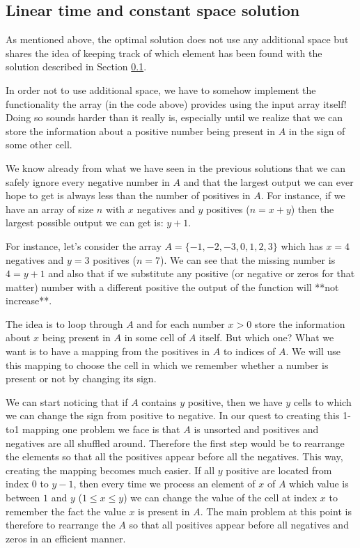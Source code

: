 \subsection{Linear time and constant space solution}
\label{first_positive_missing:sec:linear_space}
As mentioned above, the optimal solution does not use any additional space but shares the idea of keeping track of which element has been found with the solution described in Section \ref{first_positive_missing:sec:linear_space}. 

In order not to use additional space, we have to somehow implement the functionality the array  (in the code above) provides using the input array itself! Doing so sounds harder than it really is, especially until we realize that we can store the information about a positive number being present in $A$ in the sign of some other cell.

We know already from what we have seen in the previous solutions that we can safely ignore every negative number in $A$ and that the largest output we can ever hope to get is always less than the number of positives in $A$. For instance, if we have an array of size $n$ with $x$ negatives and $y$ positives ($n=x+y$) then the largest possible output we can get is: $y+1$. 

For instance, let's consider the array $A=\{-1, -2, -3, 0, 1, 2, 3\}$ which has $x=4$ negatives and $y=3$ positives ($n=7$). We can see that the missing number is $4=y+1$ and also that if we substitute any positive (or negative or zeros for that matter) number with a different positive the output of the function will **not increase**. 

The idea is to loop through $A$ and for each number $x>0$ store the information about $x$ being present in $A$ in some cell of $A$ itself. But which one? What we want is to have a mapping from the positives in $A$ to indices of $A$. We will use this mapping to choose the cell in which we remember whether a number is present or not by changing its sign.

We can start noticing that if $A$ contains $y$ positive, then we have $y$ cells to which we can change the sign from positive to negative. In our quest to creating this 1-to1 mapping one problem we face is that $A$ is unsorted and positives and negatives are all shuffled around. Therefore the first step would be to rearrange the elements so that all the positives appear before all the negatives. This way, creating the mapping becomes much easier. If all $y$ positive are located from index $0$ to $y-1$, then every time we process an element of $x$ of $A$ which value is between $1$ and $y$ ($1 \leq x \leq y$) we can change the value of the cell at index $x$ to remember the fact the value $x$ is present in $A$. The main problem at this point is therefore to rearrange the $A$ so that all positives appear before all negatives and zeros in an efficient manner.


